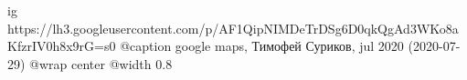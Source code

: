  
 
 
 
 


\ifcmt
  ig https://lh3.googleusercontent.com/p/AF1QipNIMDeTrDSg6D0qkQgAd3WKo8aKfzrIV0h8x9rG=s0
	@caption google maps, Тимофей Суриков, jul 2020 (2020-07-29)
  @wrap center
  @width 0.8
\fi


